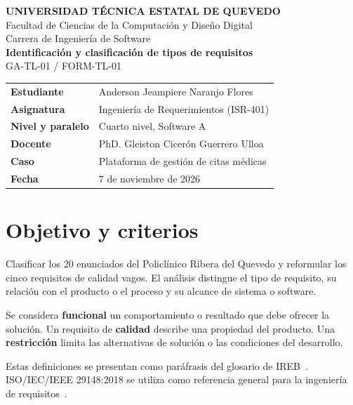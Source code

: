 \documentclass[11pt,a4paper]{article}
\begin{document}
\begin{center}
    {\large\bfseries
    UNIVERSIDAD TÉCNICA ESTATAL DE QUEVEDO}\\[4pt]

    Facultad de Ciencias de la Computación y Diseño Digital\\
    Carrera de Ingeniería de Software\\[10pt]

    {\Large\bfseries
    Identificación y clasificación de tipos de requisitos}\\[5pt]

    GA-TL-01 / FORM-TL-01
\end{center}

\begin{tabularx}{\textwidth}{@{}>{\bfseries}lX@{}}
    Estudiante &
    Anderson Jeampiere Naranjo Flores\\

    Asignatura &
    Ingeniería de Requerimientos (ISR-401)\\

    Nivel y paralelo &
    Cuarto nivel, Software A\\

    Docente &
    PhD. Gleiston Cicerón Guerrero Ulloa\\

    Caso &
    Plataforma de gestión de citas médicas\\

    Fecha &
    7 de noviembre de 2026\\
\end{tabularx}

\section{Objetivo y criterios}

Clasificar los 20 enunciados del Policlínico Ribera del Quevedo
y reformular los cinco requisitos de calidad vagos. El análisis
distingue el tipo de requisito, su relación con el producto o el
proceso y su alcance de sistema o software.

Se considera \textbf{funcional} un comportamiento o resultado que
debe ofrecer la solución. Un requisito de \textbf{calidad} describe
una propiedad del producto. Una \textbf{restricción} limita las
alternativas de solución o las condiciones del desarrollo.

Estas definiciones se presentan como paráfrasis del glosario de
IREB~\cite{ireb}. ISO/IEC/IEEE 29148:2018 se utiliza como referencia
general para la ingeniería de requisitos~\cite{ieee}.
\end{document}
